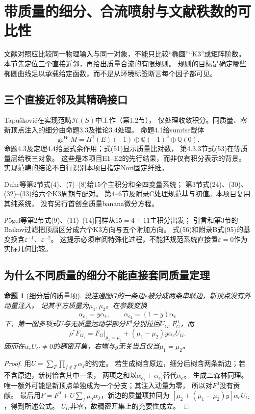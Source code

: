 \documentclass[11pt,a4paper]{ctexart}
\theoremstyle{cnplain}\newtheorem{theorem}{定理}[section]
\newtheorem{proposition}[theorem]{命题}
\theoremstyle{definition}\newtheorem{definition}[theorem]{定义}
\theoremstyle{remark}\newtheorem{remark}[theorem]{注}
\newcommand{\Q}{\mathbb Q}\newcommand{\cC}{\mathcal C}
\begin{document}
\section{带质量的细分、合流喷射与文献秩数的可比性}
\label{sec:subdivisioncomparison}

文献对照应比较同一物理输入与同一对象，不能只比较“椭圆”“K3”或矩阵阶数。
本节先定位三个直接近邻，再给出质量合流的有限规则。
规则的目标是确定哪些椭圆曲线足以承载给定函数，而不是从环境标签断言每个因子都可见。

\subsection{三个直接近邻及其精确接口}
\label{subsec:directneighbours}
Tapušković\cite{LitTap}在实现范畴$\mathcal H(S)$中工作（第1.2节），
仅处理收敛积分。同质量、零新顶点注入的细分由命题3.3及推论3.4处理。
命题4.1给sunrise载体
\[
 \operatorname{gr}^{W}M
 =H^1(E)(-1)\oplus\Q(-1)^3\oplus\Q(0).
\]
命题4.3及定理4.4给显式余作用；式(51)显示质量比对数，
第4.3.3节式(53)在等质量层给秩三对象。
这些是本项目E1--E2的先行结果，而非仅有积分表示的背景。
实现范畴的结论不自行识别本项目指定Nori固定纤维。

Duhr等\cite{LitDMPS}第2节式(4)、(7)--(8)给$15$个主积分和全四变量系统；
第3节式(24)、(30)、(32)--(33)给六个K3周期与配对。
第4--6节及附录C处理规范基与初值。本项目复用其纯系统，
没有另行首创全质量banana微分方程。

Pögel等\cite{LitPTWW}第2节式(9)、(11)--(14)同样从$15=4+11$主积分出发；
引言和第3节的Baikov过滤把顶扇区分成六个K3方向与五个附加方向。
式(56)和附录B式(95)的基变换含$\varepsilon^{-1}$、$\varepsilon^{-2}$。
这提示必须审阅特殊化过程，不能把规范系统直接置$\varepsilon=0$作为实际几何比较。

\subsection{为什么不同质量的细分不能直接套同质量定理}
\begin{proposition}[细分后的质量项]\label{prop:splitmassidentity}
设连通图$G$的一条边$e$被分成两条串联边，新顶点没有外动量注入。
记其平方质量为$\mu_1,\mu_2$。在参数变换
\[
 \alpha_{e_1}=y\alpha_e,\qquad
 \alpha_{e_2}=(1-y)\alpha_e
\]
下，第一图多项式$U$与无质量运动学部分$F^0$分别拉回$U_G,F_G^0$，而
\begin{equation}\label{eq:splitmassidentity}
 \rho^*F_{G_s}
 =F_G\big|_{\mu_e=\mu_2}
   +(\mu_1-\mu_2)y\alpha_eU_G.
\end{equation}
因而在$\alpha_eU_G\ne0$的稠密开集，右端与$y$无关当且仅当$\mu_1=\mu_2$。
\end{proposition}
\begin{proof}
用$U=\sum_T\prod_{f\notin T}\alpha_f$的约定。
若生成树含原边，细分后树含两条新边；若不含原边，新树恰含其中一条，
两项之和以$\alpha_{e_1}+\alpha_{e_2}$替代$\alpha_e$。
生成二森林同理。唯一额外可能是新顶点单独成为一个分支；其注入动量为零，
所以对$F^0$没有贡献。
最后用$F=F^0+U\sum_f\mu_f\alpha_f$，新边的质量项拉回为
$[\mu_2+(\mu_1-\mu_2)y]\alpha_eU_G$，得到所述公式。
$U_G$非零，故稠密开集上的充要性成立。
\end{proof}
\end{document}
